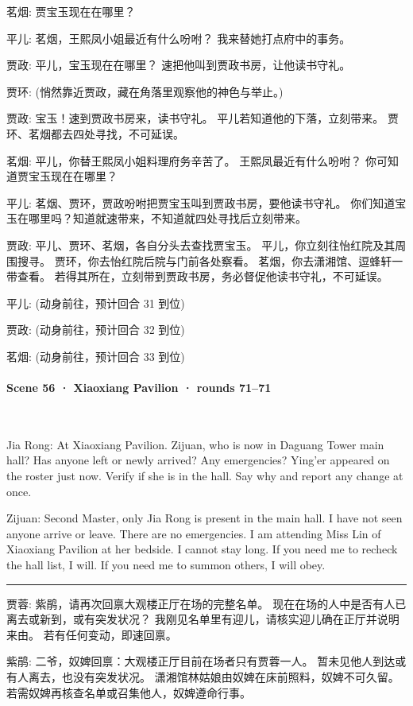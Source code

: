\begin{zhblock}
{\color{gray} 茗烟:
贾宝玉现在在哪里？
\par 平儿:
茗烟，王熙凤小姐最近有什么吩咐？
我来替她打点府中的事务。
\par 贾政:
平儿，宝玉现在在哪里？
速把他叫到贾政书房，让他读书守礼。
\par 贾环:
(悄然靠近贾政，藏在角落里观察他的神色与举止。)
\par 贾政:
宝玉！速到贾政书房来，读书守礼。
平儿若知道他的下落，立刻带来。
贾环、茗烟都去四处寻找，不可延误。
\par 茗烟:
平儿，你替王熙凤小姐料理府务辛苦了。
王熙凤最近有什么吩咐？
你可知道贾宝玉现在在哪里？
\par 平儿:
茗烟、贾环，贾政吩咐把贾宝玉叫到贾政书房，要他读书守礼。
你们知道宝玉在哪里吗？知道就速带来，不知道就四处寻找后立刻带来。
\par 贾政:
平儿、贾环、茗烟，各自分头去查找贾宝玉。
平儿，你立刻往怡红院及其周围搜寻。
贾环，你去怡红院后院与门前各处察看。
茗烟，你去潇湘馆、逗蜂轩一带查看。
若得其所在，立刻带到贾政书房，务必督促他读书守礼，不可延误。
\par 平儿:
(动身前往，预计回合 31 到位)
\par 贾政:
(动身前往，预计回合 32 到位)
\par 茗烟:
(动身前往，预计回合 33 到位)}
\end{zhblock}
\paragraph{Scene 56 · Xiaoxiang Pavilion · rounds 71–71}\mbox{}\\[2pt]
\begin{zhblock}\small\setlength{\parskip}{3pt}
Jia Rong:
At Xiaoxiang Pavilion.
Zijuan, who is now in Daguang Tower main hall?
Has anyone left or newly arrived? Any emergencies?
Ying'er appeared on the roster just now.
Verify if she is in the hall.
Say why and report any change at once.
\par Zijuan:
Second Master, only Jia Rong is present in the main hall.
I have not seen anyone arrive or leave.
There are no emergencies.
I am attending Miss Lin of Xiaoxiang Pavilion at her bedside.
I cannot stay long.
If you need me to recheck the hall list, I will.
If you need me to summon others, I will obey.
\par\textcolor{gray}{\rule{0.3\textwidth}{0.4pt}}\par
{\color{gray} 贾蓉:
紫鹃，请再次回禀大观楼正厅在场的完整名单。
现在在场的人中是否有人已离去或新到，或有突发状况？
我刚见名单里有迎儿，请核实迎儿确在正厅并说明来由。
若有任何变动，即速回禀。
\par 紫鹃:
二爷，奴婢回禀：大观楼正厅目前在场者只有贾蓉一人。
暂未见他人到达或有人离去，也没有突发状况。
潇湘馆林姑娘由奴婢在床前照料，奴婢不可久留。
若需奴婢再核查名单或召集他人，奴婢遵命行事。}
\end{zhblock}
